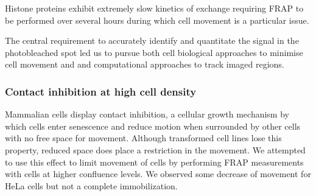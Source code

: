 
    Histone proteins exhibit extremely slow kinetics of exchange
    requiring FRAP to be performed over several hours during which cell movement is
    a particular issue. %


    The central requirement to accurately identify and quantitate the signal
    in the photobleached spot led us to pursue both cell biological approaches to
    minimise cell movement and and computational approaches to track imaged regions.

    \subsubsection{Contact inhibition at high cell density}

      Mammalian cells display contact inhibition,
      a cellular growth mechanism by which cells enter senescence and reduce motion
      when surrounded by other cells with no free space for movement.
      Although transformed cell lines lose this property,
      reduced space does place a restriction in the movement.
      We attempted to use this effect to limit movement of cells
      by performing FRAP measurements with cells at higher confluence levels.
      We observed some decrease of movement for HeLa cells but not a complete immobilization.

